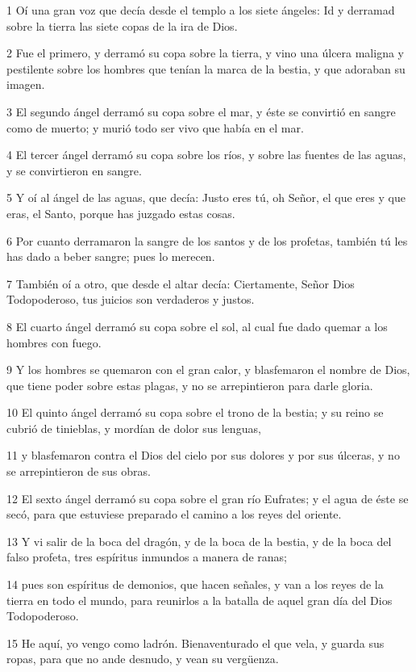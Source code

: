 \par 1 Oí una gran voz que decía desde el templo a los siete ángeles: Id y derramad sobre la tierra las siete copas de la ira de Dios.
\par 2 Fue el primero, y derramó su copa sobre la tierra, y vino una úlcera maligna y pestilente sobre los hombres que tenían la marca de la bestia, y que adoraban su imagen.
\par 3 El segundo ángel derramó su copa sobre el mar, y éste se convirtió en sangre como de muerto; y murió todo ser vivo que había en el mar.
\par 4 El tercer ángel derramó su copa sobre los ríos, y sobre las fuentes de las aguas, y se convirtieron en sangre.
\par 5 Y oí al ángel de las aguas, que decía: Justo eres tú, oh Señor, el que eres y que eras, el Santo, porque has juzgado estas cosas.
\par 6 Por cuanto derramaron la sangre de los santos y de los profetas, también tú les has dado a beber sangre; pues lo merecen.
\par 7 También oí a otro, que desde el altar decía: Ciertamente, Señor Dios Todopoderoso, tus juicios son verdaderos y justos.
\par 8 El cuarto ángel derramó su copa sobre el sol, al cual fue dado quemar a los hombres con fuego.
\par 9 Y los hombres se quemaron con el gran calor, y blasfemaron el nombre de Dios, que tiene poder sobre estas plagas, y no se arrepintieron para darle gloria.
\par 10 El quinto ángel derramó su copa sobre el trono de la bestia; y su reino se cubrió de tinieblas, y mordían de dolor sus lenguas,
\par 11 y blasfemaron contra el Dios del cielo por sus dolores y por sus úlceras, y no se arrepintieron de sus obras.
\par 12 El sexto ángel derramó su copa sobre el gran río Eufrates; y el agua de éste se secó, para que estuviese preparado el camino a los reyes del oriente.
\par 13 Y vi salir de la boca del dragón, y de la boca de la bestia, y de la boca del falso profeta, tres espíritus inmundos a manera de ranas;
\par 14 pues son espíritus de demonios, que hacen señales, y van a los reyes de la tierra en todo el mundo, para reunirlos a la batalla de aquel gran día del Dios Todopoderoso.
\par 15 He aquí, yo vengo como ladrón. Bienaventurado el que vela, y guarda sus ropas, para que no ande desnudo, y vean su vergüenza.
